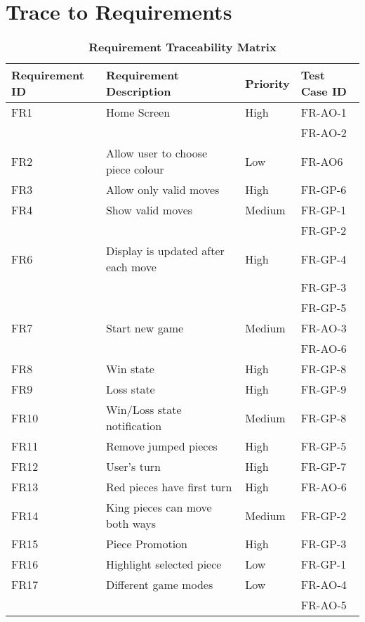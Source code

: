 \documentclass[12pt, titlepage]{article}
\begin{document}
\section{Trace to Requirements}
\newpage
\begin{table}[H]
    \begin{center}
	\caption{\bf Requirement Traceability Matrix}
 	\begin{adjustwidth}{-1.5cm}{}
	\begin{tabularx}{1.2\textwidth}{|p{3.4cm}|p{7cm}|p{1.6cm}|X|}
		\hline 
		{\bf Requirement ID}  & {\bf Requirement Description} & {\bf Priority} & {\bf Test Case ID} \\
		\hline
		FR1 & Home Screen & High & FR-AO-1\\
		& & & FR-AO-2\\
		\hline
		FR2 & Allow user to choose piece colour & Low & FR-AO6\\
		\hline
		FR3 & Allow only valid moves & High & FR-GP-6\\
		\hline
		FR4 & Show valid moves & Medium & FR-GP-1\\
		& & & FR-GP-2\\
		\hline
		FR6 & Display is updated after each move & High & FR-GP-4\\
		& & & FR-GP-3\\
		& & & FR-GP-5\\
		\hline
		FR7 & Start new game & Medium & FR-AO-3\\
		& & & FR-AO-6\\
		\hline
		FR8 & Win state & High & FR-GP-8 \\
		\hline
		FR9 & Loss state & High & FR-GP-9 \\
		\hline
		FR10 & Win/Loss state notification & Medium & FR-GP-8 \\
		\hline
		FR11 & Remove jumped pieces & High & FR-GP-5\\
		\hline
		FR12 & User's turn & High & FR-GP-7\\
		\hline
		FR13 & Red pieces have first turn & High &  FR-AO-6\\
		\hline
		FR14 & King pieces can move both ways & Medium & FR-GP-2\\
		\hline
		FR15 & Piece Promotion & High & FR-GP-3\\
		\hline
		FR16 & Highlight selected piece & Low & FR-GP-1\\
		\hline
		FR17 & Different game modes & Low & FR-AO-4\\
	     &  &  & FR-AO-5\\

\end{tabularx}
\end{adjustwidth}
\end{center}
\end{table}
\end{document}
